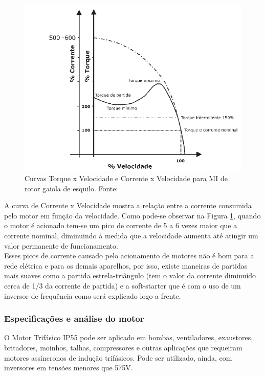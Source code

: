 \begin{figure}[h!]
\centering
\includegraphics[scale=0.8]{figuras/grafico_motor.png}
\caption{Curvas Torque x Velocidade e Corrente x Velocidade para MI de rotor gaiola de esquilo. Fonte:\cite{WEG}}
\label{fig:curvas_motor}
\end{figure}

A curva de Corrente x Velocidade mostra a relação entre a corrente consumida pelo motor em função da velocidade. 
Como pode-se observar na Figura \ref{fig:curvas_motor}, quando o motor é acionado tem-se um pico de corrente de 5 a
6 vezes maior que a corrente nominal, diminuindo à medida que a velocidade aumenta até atingir um valor permanente de funcionamento.\\

Esses picos de corrente causado pelo acionamento de motores não é bom para a rede elétrica e para os demais 
aparelhos, por isso, existe maneiras de partidas mais suaves como a partida estrela-triângulo (tem o valor da corrente 
diminuído cerca de 1/3 da corrente de partida) e a soft-starter que é com o uso de um inversor de frequência como será 
explicado logo a frente.\\


\subsubsection*{\textbf{Especificações e análise do motor}}

O Motor Trifásico IP55 pode ser aplicado em bombas, ventiladores, exaustores, britadores, moinhos, talhas, compressores 
e outras aplicações que requeiram motores assíncronos de indução trifásicos. Pode ser utilizado, ainda, com inversores em 
tensões menores que 575V. \cite{WEG_catalogo}

